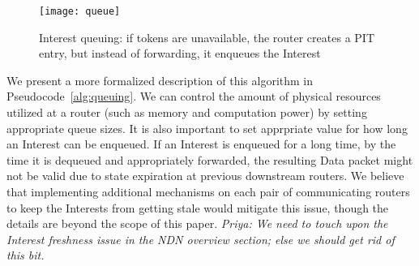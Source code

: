 \begin{figure}[htbp]
  \centering
  \texttt{[image: queue]}
  \caption{Interest queuing: if tokens are unavailable, the router creates a PIT entry, but instead of forwarding, it enqueues the Interest}
  \label{fig:queueing}
\end{figure}

We present a more formalized description of this algorithm in Pseudocode~\ref{alg:queuing}. We can control the amount of physical resources utilized at a router (such as memory and computation power) by setting appropriate queue sizes. It is also important to set apprpriate value for how long an Interest can be enqueued. If an Interest is enqueued for a long time, by the time it is dequeued and appropriately forwarded, the resulting Data packet might not be valid due to state expiration at previous downstream routers. We believe that implementing additional mechanisms on each pair of communicating routers to keep the Interests from getting stale would mitigate this issue, though the details are beyond the scope of this paper.
{\it Priya:  We need to  touch upon the Interest freshness issue in the NDN overview section; else we should get rid of this bit.}






